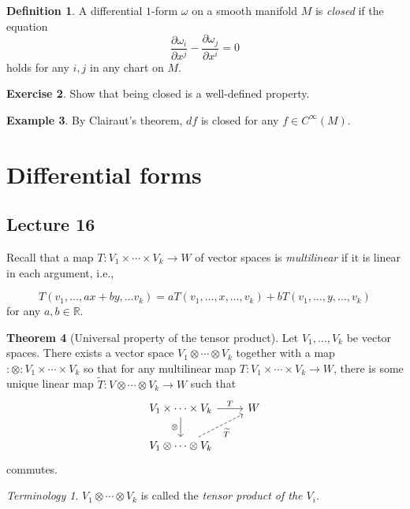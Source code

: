 \documentclass[10pt,letterpaper,cm]{nupset}
\theoremstyle{definition}
\newtheorem{definition}{Definition}[subsection]
\newtheorem{exmp}[definition]{Example}
\theoremstyle{theorem}
\newtheorem{theorem}[definition]{Theorem}
\newtheorem{exercise}[definition]{Exercise}
\theoremstyle{remark}
\newtheorem*{term}{Terminology}
\newcommand{\R}{\mathbb R}
\newcommand{\1}{\mathbf{1}}
\newcommand{\0}{\vec 0}
\begin{document}
\begin{definition}\label{closed}
A differential $1$-form $\omega$ on a smooth manifold $M$ is \textit{closed} if the equation  $$\frac{\partial{\omega_i}}{\partial{x^j}} - \frac{\partial{\omega_j}}{\partial{x^i}} =0$$ holds for any $i,j$ in any chart on $M$.
\end{definition}

\begin{exercise}
Show that being closed is a well-defined property.
\end{exercise}

\begin{exmp}
By Clairaut's theorem, $df$ is closed for any $f\in C^{\infty}(M)$. 
\end{exmp}

\section{Differential forms}

\subsection{Lecture 16}

Recall that 
a map $T: V_1 \times \cdots \times V_k \to W$ of vector spaces is \textit{multilinear} if it is linear in each argument, i.e.,

\[
T(v_1, \ldots, ax+by, \ldots v_k) = aT(v_1, \ldots, x, \ldots, v_k) +   bT(v_1, \ldots, y, \ldots, v_k) 
\] for any $a,b\in \R$.



\begin{theorem}[Universal property of the tensor product]
Let $V_1, \ldots, V_k$ be vector spaces. There exists a vector space $V_1 \otimes \cdots \otimes V_k$ together with a map $:\otimes : V_1\times \cdots \times V_k$ so that for any multilinear map $T: V_1 \times \cdots \times V_k \to W$, there is some unique linear map $\widetilde{T} : V \otimes \cdots \otimes V_k \to W$ such that 
\[
\begin{tikzcd}
V_1 \times \cdots \times V_k \arrow[d, "\otimes"'] \arrow[r, "T"] & W \\
V_1 \otimes \cdots \otimes V_k \arrow[ru, "\widetilde{T}"', dashed] & 
\end{tikzcd}
\] commutes.
\end{theorem}

\begin{term}
$V_1 \otimes \cdots \otimes V_k$ is called the \textit{tensor product of the $V_i$}.
\end{term}
\end{document}
